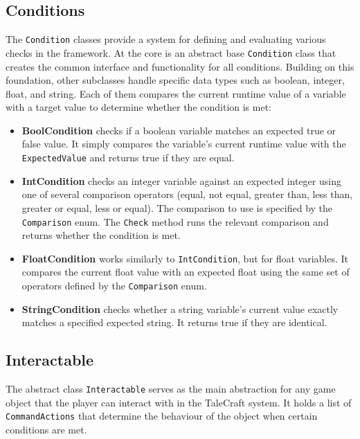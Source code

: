  \subsection{Conditions}
The \verb|Condition| classes provide a system for defining and evaluating various checks in the framework. At the core is an abstract base \verb|Condition| class that creates the common interface and functionality for all conditions. Building on this foundation, other subclasses handle specific data types such as boolean, integer, float, and string. Each of them compares the current runtime value of a variable with a target value to determine whether the condition is met: 

\begin{itemize}
    \item \textbf{BoolCondition} checks if a boolean variable matches an expected true or false value. It simply compares the variable’s current runtime value with the \verb|ExpectedValue| and returns true if they are equal.
    \item \textbf{IntCondition} checks an integer variable against an expected integer using one of several comparison operators (equal, not equal, greater than, less than, greater or equal, less or equal). The comparison to use is specified by the \verb|Comparison| enum. The \verb|Check| method runs the relevant comparison and returns whether the condition is met.
    \item \textbf{FloatCondition} works similarly to \verb|IntCondition|, but for float variables. It compares the current float value with an expected float using the same set of operators defined by the \verb|Comparison| enum.
    \item \textbf{StringCondition} checks whether a string variable’s current value exactly matches a specified expected string. It returns true if they are identical.
\end{itemize}

\subsection{Interactable}
The abstract class \verb|Interactable| serves as the main abstraction for any game object that the player can interact with in the TaleCraft system. It holds a list of \verb|CommandActions| that determine the behaviour of the object when certain conditions are met. 

